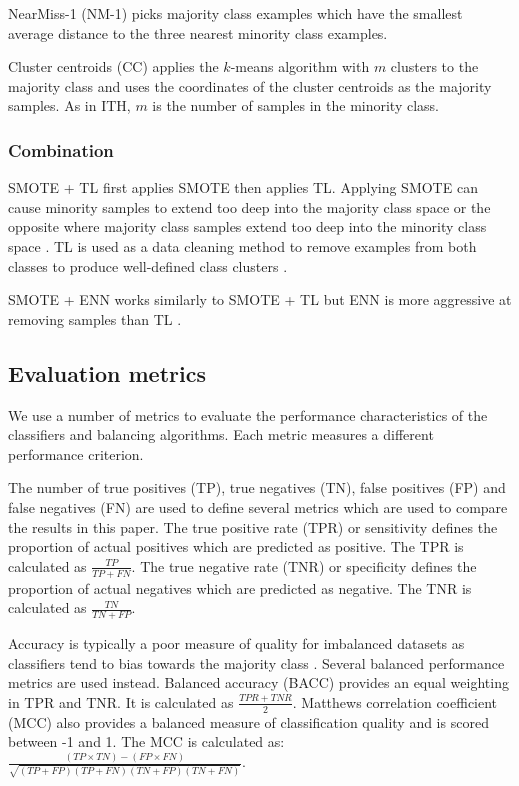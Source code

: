 \documentclass{sig-alternate-05-2015}
\begin{document}
	NearMiss-1 (NM-1) \cite{mani2003knn} picks majority class examples which have the smallest average distance to the three nearest minority class examples.
	
	Cluster centroids (CC) applies the $k$-means algorithm with $m$ clusters to the majority class and uses the coordinates of the cluster centroids as the majority samples. As in ITH, $m$ is the number of samples in the minority class.	
	
	\subsubsection{Combination}
	SMOTE + TL \cite{batista2003balancing} first applies SMOTE then applies TL. Applying SMOTE can cause minority samples to extend too deep into the majority class space or the opposite where majority class samples extend too deep into the minority class space \cite{batista2003balancing}. TL is used as a data cleaning method to remove examples from both classes to produce well-defined class clusters \cite{batista2003balancing}.
	
	SMOTE + ENN works similarly to SMOTE + TL but ENN is more aggressive at removing samples than TL \cite{Batista:2004:SBS:1007730.1007735}.
	
	\subsection{Evaluation metrics}
	We use a number of metrics to evaluate the performance characteristics of the classifiers and balancing algorithms. Each metric measures a different performance criterion.
	
	The number of true positives (TP), true negatives (TN), false positives (FP) and false negatives (FN) are used to define several metrics which are used to compare the results in this paper. The true positive rate (TPR) or sensitivity defines the proportion of actual positives which are predicted as positive. The TPR is calculated as $\frac{TP}{TP + FN}$. The true negative rate (TNR) or specificity defines the proportion of actual negatives which are predicted as negative. The TNR is calculated as $\frac{TN}{TN + FP}$. 
	
	Accuracy is typically a poor measure of quality for imbalanced datasets as classifiers tend to bias towards the majority class \cite{Batista:2004:SBS:1007730.1007735, Chawla:2004:ESI:1007730.1007733}. Several balanced performance metrics are used instead. Balanced accuracy (BACC) provides an equal weighting in TPR and TNR. It is calculated as $\frac{TPR + TNR}{2}$. Matthews correlation coefficient (MCC) also provides a balanced measure of classification quality and is scored between -1 and 1. The MCC is calculated as: $\frac{(TP \times TN) - (FP \times FN)}{\sqrt{(TP + FP)(TP + FN)(TN + FP)(TN + FN)}}$. 
	
\end{document}
